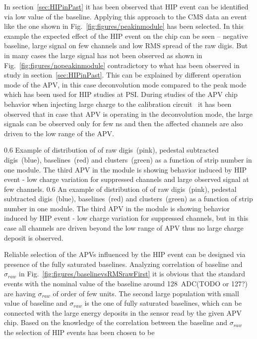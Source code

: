 In section~\ref{sec:HIPinPast} it has been observed that HIP event can be identified via low value of the baseline. Applying this approach to the CMS data an event like the one shown in Fig.~\ref{fig:figures/peakinmodule} has been selected. In this example the expected effect of the HIP event on the chip can be seen -- negative baseline, large signal on few channels and low RMS spread of the raw digis. But in many cases the large signal has not been observed as shown in Fig.~\ref{fig:figures/nopeakinmodule} contradictory to what has been observed in study in section~\ref{sec:HIPinPast}. This can be explained by different operation mode of the APV, in this case deconvolution mode compared to the peak mode which has been used for HIP studies at PSI. During studies of the APV chip behavior when injecting large charge to the calibration circuit~\cite{Bainbridge:2002bda} it has been observed that in case that APV is operating in the deconvolution mode, the large signals can be observed only for few ns and then the affected channels are also driven to the low range of the APV. 

                 {0.6}       %
                 {Example of distribution of of raw digis~(pink), pedestal subtracted digis~(blue), baselines~(red) and clusters~(green) as a function of strip number in one module. The third APV in the module is showing behavior induced by HIP event - low charge variation for suppressed channels and large observed signal at few channels. } %
                 {0.6}       %
                 {An example of distribution of of raw digis~(pink), pedestal subtracted digis~(blue), baselines~(red) and clusters~(green) as a function of strip number in one module. The third APV in the module is showing behavior induced by HIP event - low charge variation for suppressed channels, but in this case all channels are driven beyond the low range of APV thus no large charge deposit is observed. } %

Reliable selection of the APVs influenced by the HIP event can be designed via presence of the fully saturated baselines. Analyzing correlation of baseline and $\sigma_{raw}$ in Fig.~\ref{fig:figures/baselinevsRMSrawFirst} it is obvious that the standard events with the nominal value of the baseline around 128~ADC(TODO or 127?) are having $\sigma_{raw}$ of order of few units. The second large population with small value of baseline and $\sigma_{raw}$ is the one of fully saturated baselines, which can be connected with the large energy deposits in the sensor read by the given APV chip. Based on the knowledge of the correlation between the baseline and $\sigma_{raw}$ the selection of HIP events has been chosen to be 

